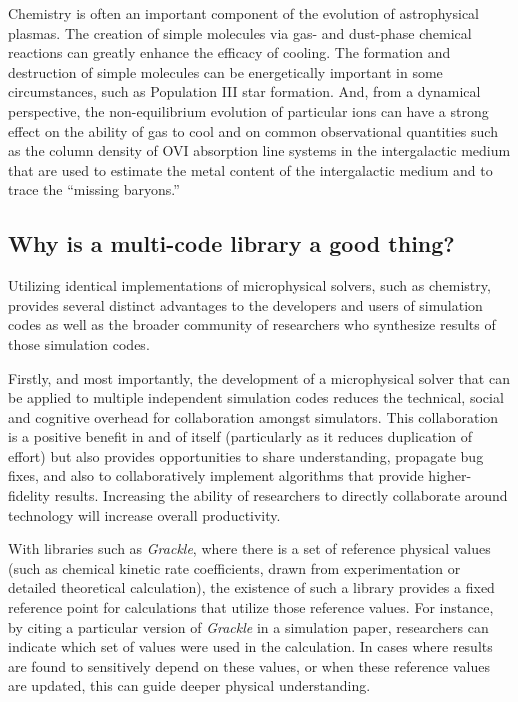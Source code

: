 Chemistry is often an important component of the evolution of
astrophysical plasmas.  The creation of simple molecules via gas- and
dust-phase chemical reactions can greatly enhance the efficacy of
cooling. \citep{1979ApJS...41..555H,2005ApJ...626..627O} The formation
and destruction of simple molecules can be energetically important in
some circumstances, such as Population III star formation.
\citep{1998ApJ...508..141O,2002Sci...295...93A,2008MNRAS.388.1627G,2009Sci...325..601T}
And, from a dynamical perspective, the non-equilibrium evolution of
particular ions can have a strong effect on the ability of gas to cool
\citep{1997NewA....2..181A,1997NewA....2..209A} and on common
observational quantities such as the column density of OVI absorption
line systems in the intergalactic medium that are used to estimate the
metal content of the intergalactic medium and to trace the ``missing
baryons.'' \citep{2006ApJ...650..573C,2011ApJ...731....6S,2013MNRAS.434.1043O,2014ApJ...796...49S}


\subsection{Why is a multi-code library a good thing?}

Utilizing identical implementations of microphysical solvers, such as
chemistry, provides several distinct advantages to the developers and users of
simulation codes as well as the broader community of researchers who synthesize
results of those simulation codes.

Firstly, and most importantly, the development of a microphysical solver that
can be applied to multiple independent simulation codes reduces the technical,
social and cognitive overhead for collaboration amongst simulators.
This collaboration is a positive benefit in and of itself (particularly as it
reduces duplication of effort) but also provides opportunities to share
understanding, propagate bug fixes, and also to collaboratively implement 
algorithms that provide higher-fidelity results.  Increasing the ability of
researchers to directly collaborate around technology will increase overall
productivity.

With libraries such as \textit{Grackle}, where there is a set of reference
physical values (such as chemical kinetic rate coefficients, drawn from
experimentation or detailed theoretical calculation), the existence of such a
library provides a fixed reference point for calculations that utilize those
reference values.  For instance, by citing a particular version of
\textit{Grackle} in a simulation paper, researchers can indicate which set of
values were used in the calculation.  In cases where results are found to
sensitively depend on these values, or when these reference values are updated,
this can guide deeper physical understanding.


